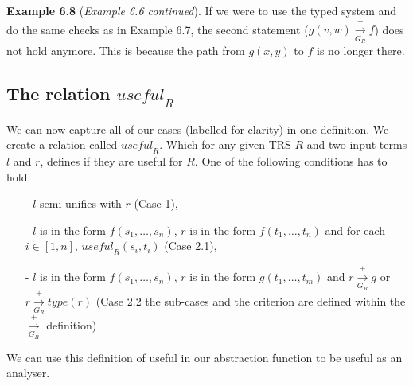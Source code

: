 \textbf{Example 6.8} (\textit{Example 6.6 continued}). If we were to use the typed system and do the same checks as in Example 6.7, the second statement ($g(v, w) \xrightarrow[G_R]{+} f$) does not hold anymore. This is because the path from $g(x, y)$ to $f$ is no longer there.

\subsection*{The relation $\textit{useful}_R$}
We can now capture all of our cases (labelled for clarity) in one definition. We create a relation called $\textit{useful}_R$. Which for any given TRS $R$ and two input terms $l$ and $r$, defines if they are useful for $R$. One of the following conditions has to hold:
\begin{itemize}
    \itemsep 0em
    \item[-] $l$ semi-unifies with $r$ (Case 1),
    \item[-] $l$ is in the form $f(s_1, \dots, s_n)$, $r$ is in the form $f(t_1, \dots, t_n)$ and for each $i \in [1, n]$, $\textit{useful}_R(s_i, t_i)$ (Case 2.1),
    \item[-] $l$ is in the form $f(s_1, \dots, s_n)$, $r$ is in the form $g(t_1, \dots, t_m)$ and $r \xrightarrow[G_R]{+} g$ or $r \xrightarrow[G_R]{+} \textit{type}(r)$ (Case 2.2 the sub-cases and the criterion are defined within the $\xrightarrow[G_R]{+}$ definition)
\end{itemize}

We can use this definition of useful in our abstraction function to be useful as an analyser. 

